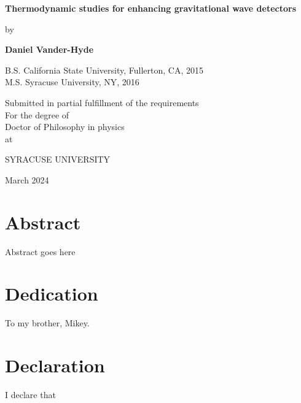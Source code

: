 \documentclass[12pt]{report}
\begin{document}
\begin{titlepage}
\begin{center}
       \vspace*{1cm}

       \textbf{\LARGE Thermodynamic studies for enhancing gravitational wave detectors}

       \vspace{0.5cm}
       {\large by}
            
       \vspace{0.5cm}

       \textbf{\large Daniel Vander-Hyde}


       \vspace{0.5cm}
       {\large B.S. California State University, Fullerton, CA, 2015}
       \\
       {\large M.S. Syracuse University, NY, 2016}
       
       \vspace{1.0cm}
             
       {\large Submitted in partial fulfillment of the requirements\\
       For the degree of \\
       Doctor of Philosophy in physics\\
       at}

       \vspace{0.5cm}

       {\large \uppercase{Syracuse University}}
       \vfill
     
       March 2024
            
   \end{center}
\end{titlepage}

\chapter*{Abstract}
Abstract goes here

\chapter*{Dedication}
To my brother, Mikey.

\chapter*{Declaration}
I declare that
\end{document}
